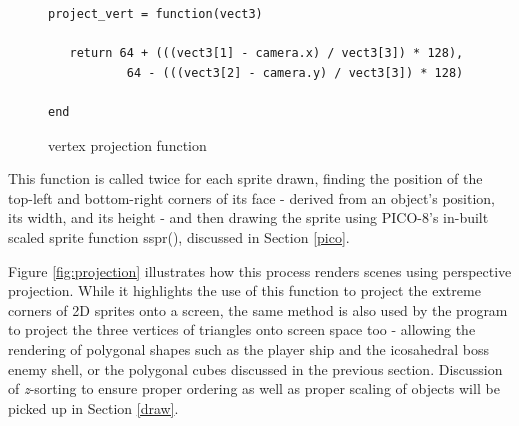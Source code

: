 \documentclass[11pt]{article}
\begin{document}
\begin{figure}[h]
   \begin{lstlisting}
project_vert = function(vect3)

   return 64 + (((vect3[1] - camera.x) / vect3[3]) * 128),
           64 - (((vect3[2] - camera.y) / vect3[3]) * 128)

end
   \end{lstlisting}
   \caption{vertex projection function}
   \label{fig:codeproject}
\end{figure}

This function is called twice for each sprite drawn, finding the position of the top-left and bottom-right
corners of its face - derived from an object's position, its width, and its height - and then drawing the
sprite using PICO-8's in-built scaled sprite function sspr(), discussed in Section \ref{pico}.

Figure \ref{fig:projection} illustrates how this process renders scenes using perspective projection.
While it highlights the use of this function to project the extreme corners of 2D sprites onto a screen,
the same method is also used by the program to project the three vertices of triangles onto screen space
too - allowing the rendering of polygonal shapes such as the player ship and the icosahedral boss enemy shell,
or the polygonal cubes discussed in the previous section. Discussion of \textit{z}-sorting to ensure proper
ordering as well as proper scaling of objects will be picked up in Section \ref{draw}.
\end{document}
